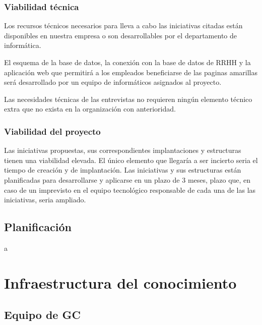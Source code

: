 \documentclass[twoside]{article}
\begin{document}
\subsubsection{Viabilidad técnica}
Los recursos técnicos necesarios para lleva a cabo las iniciativas citadas están disponibles en nuestra empresa o son desarrollables por el departamento de informática.\par
El esquema de la base de datos, la conexión con la base de datos de RRHH y la aplicación web que permitirá a los empleados beneficiarse de las paginas amarillas será desarrollado por un equipo de informáticos asignados al proyecto. \par
Las necesidades técnicas de las entrevistas no requieren ningún elemento técnico extra que no exista en la organización con anterioridad.

\subsubsection{Viabilidad del proyecto}
Las iniciativas propuestas, sus correspondientes implantaciones y estructuras tienen una viabilidad elevada. El único elemento que llegaría a ser incierto seria el tiempo de creación y de implantación. Las iniciativas y sus estructuras están planificadas para desarrollarse y aplicarse en un plazo de 3 meses, plazo que, en caso de un imprevisto en el equipo tecnológico responsable de cada una de las las iniciativas, seria ampliado.


\subsection{Planificación}

a


\section{Infraestructura del conocimiento}

\subsection{Equipo de GC}
\end{document}
